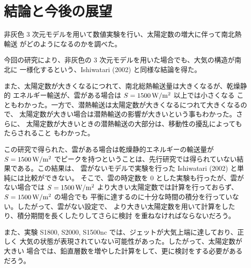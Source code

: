\documentclass[body]{subfiles}
\begin{document}
\chapter{結論と今後の展望}\label{conclusion}

非灰色 3 次元モデルを用いて数値実験を行い、太陽定数の増大に伴って南北熱輸送
がどのようになるのかを調べた。

今回の研究により、非灰色の 3 次元モデルを用いた場合でも、大気の構造が南北に
一様化するという、Ishiwatari \etal (2002) と同様な結論を得た。

また、太陽定数が大きくなるにつれて、南北総熱輸送量は大きくなるが、乾燥静的
エネルギー輸送が、雲がある場合は \(S=1500\hmu{W/m^2}\) 以上では小さくなる
こともわかった。一方で、潜熱輸送は太陽定数が大きくなるにつれて大きくなるので、
太陽定数が大きい場合は潜熱輸送の影響が大きいという事もわかった。さらに、
太陽定数が大きいときの潜熱輸送の大部分は、移動性の擾乱によってもたらされること
もわかった。

この研究で得られた、雲がある場合は乾燥静的エネルギーの輸送量が \(S=1500\hmu{W/m^2}\)
でピークを持つということは、先行研究では得られていない結果である。この結果は、
雲がないモデルで実験を行った Ishiwatari \etal (2002) と単純には比較ができない。
そこで、雲の時定数を 0 とした実験も行ったが、雲がない場合では \(S=1500\hmu{W/m^2}\)
より大きい太陽定数では計算を行っておらず、\(S=1500\hmu{W/m^2}\) の場合でも
平衡に達するのに十分な時間の積分を行っていない。したがって、雲がない設定で、
より大きい太陽定数を用いて計算をしたり、積分期間を長くしたりしてさらに検討
を重ねなければならないだろう。

また、実験 S1800, S2000, S1500nc では、ジェットが大気上端に達しており、正しく
大気の状態が表現されていない可能性があった。したがって、太陽定数が大きい
場合では、鉛直層数を増やした計算をして、更に検討をする必要があるだろう。
\end{document}
